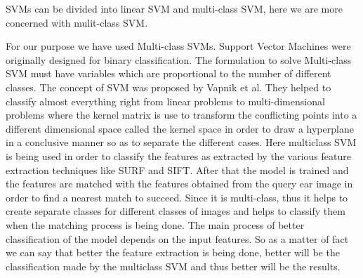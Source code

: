 SVMs can be divided into linear SVM and multi-class SVM, here we are more concerned with mulit-class SVM\cite{multiSVM}.

For our purpose we have used Multi-class SVMs. Support Vector Machines were originally designed for binary classification. The formulation to solve Multi-class SVM must have variables which are proportional to the number of different classes. The concept of SVM was proposed by Vapnik  et al. They helped to classify almost everything right from linear problems to multi-dimensional problems where the kernel matrix is use to transform the conflicting points into a different dimensional space called the kernel space in order to draw a hyperplane in a conclusive manner so as to separate the different cases. Here multiclass SVM is being used in order to classify the features as extracted by the various feature extraction techniques like SURF and SIFT. After that the model is trained and the features are matched with the features obtained from the query ear image in order to find a nearest match to succeed. Since it is multi-class, thus it helps to create separate classes for different classes of images and helps to classify them when the matching process is being done. The main process of better classification of the model depends on the input features. So as a matter of fact we can say that better the feature extraction is being done, better will be the classification made by the multiclass SVM and thus better will be the results.



